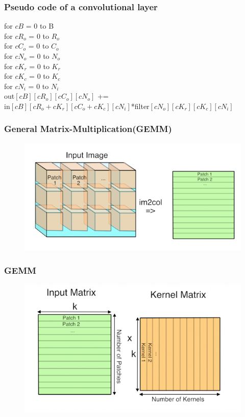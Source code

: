 \begin{frame}
	\frametitle{Pseudo code of a convolutional layer}
	for $cB$ = 0 to B\\
	\hspace{0.2cm}for $cR_{o}$ = 0 to $R_{o}$\\
	\hspace{0.4cm}for $cC_{o}$ = 0 to $C_{o}$\\
	\hspace{0.6cm}for $cN_{o}$ = 0 to $N_{o}$\\
	\hspace{0.8cm}for $cK_{r}$ = 0 to $K_{r}$\\
	\hspace{1cm}for $cK_{c}$ = 0 to $K_{c}$\\
	\hspace{1.2cm}for $cN_{i}$ = 0 to $N_{i}$\\
	\hspace{1.4cm}out$[cB][cR_{o}][cC_{o}][cN_{o}]$ +=\\
	\hspace{1.4cm}in$[cB][cR_{o}+cK_{r}][cC_{o}+cK_{c}][cN_{i}]$*filter$[cN_{o}][cK_{r}][cK_{c}][cN_{i}]$
		
\end{frame}

\begin{frame}
	\frametitle{General Matrix-Multiplication(GEMM)}
	\begin{figure}
		\includegraphics[scale=0.5]{figure/imtocol.PNG}
	\end{figure}
\end{frame}

\begin{frame}
	\frametitle{GEMM}
	\begin{figure}
		\includegraphics[scale=0.5]{figure/gemm.PNG}
	\end{figure}
\end{frame}

